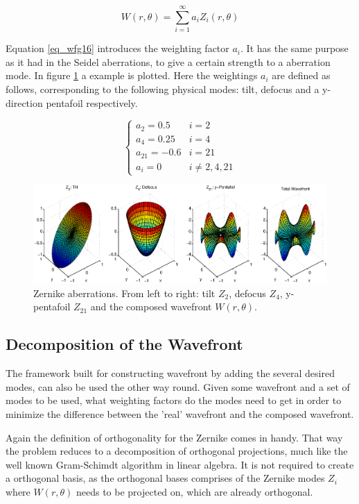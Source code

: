 \documentclass{article}
\begin{document}
\begin{equation}
W(r,\theta) = \sum \limits_{i=1}^{\infty} a_i Z_i(r,\theta)
\label{eq_wfg16}
\end{equation}

Equation \ref{eq_wfg16} introduces the weighting factor $a_i$. It has the same purpose as it had in the Seidel aberrations, to give a certain strength to a aberration mode. In figure \ref{fig_wfg02} a example is plotted. Here the weightings $a_i$ are defined as follows, corresponding to the following physical modes: tilt, defocus and a y-direction pentafoil respectively.

\begin{equation}
\begin{cases}
a_2 = 0.5 & i = 2 \\
a_4 = 0.25 & i = 4 \\
a_{21} = -0.6 & i = 21 \\
a_i = 0 & i \neq 2,4,21
\end{cases}
\label{eq_wfg17}
\end{equation}

\begin{figure}[H]
	\center
	\includegraphics[width=1.0\textwidth, height=.3\textwidth]{Figures/Zernike.eps}
	\caption{Zernike aberrations. From left to right: tilt $Z_2$, defocus $Z_4$, y-pentafoil $Z_{21}$ and the composed wavefront $W(r,\theta)$.}
	\label{fig_wfg02}
\end{figure}

\newpage
\subsection{Decomposition of the Wavefront}
The framework built for constructing wavefront by adding the several desired modes, can also be used the other way round. Given some wavefront and a set of modes to be used, what weighting factors do the modes need to get in order to minimize the difference between the 'real' wavefront and the composed wavefront.

Again the definition of orthogonality for the Zernike comes in handy. That way the problem reduces to a decomposition of orthogonal projections, much like the well known Gram-Schimdt algorithm in linear algebra. It is not required to create a orthogonal basis, as the orthogonal bases comprises of the Zernike modes $Z_i$ where $W(r,\theta)$ needs to be projected on, which are already orthogonal.
\end{document}
